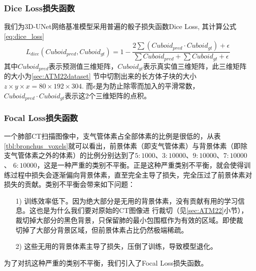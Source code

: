 \subsubsection{Dice Loss损失函数}
我们为3D-UNet网络基准模型采用普遍的骰子损失函数Dice Loss, 其计算公式\ref{eq:dice_loss}
\begin{equation}\label{eq:dice_loss}
    L_{dice}\left(Cuboid_{pred}, Cuboid_{gt}\right) = 1 - \frac{2\sum{\left(Cuboid_{pred} \cdot Cuboid_{gt}\right)} + \epsilon}
    {\sum{Cuboid_{pred}} + \sum{Cuboid_{gt}} + \epsilon}
\end{equation}
其中${Cuboid}_{pred}$表示预测值三维矩阵，${Cuboid}_{gt}$表示真实值三维矩阵，此三维矩阵的大小为\ref{sec:ATM22dataset}
节中切割出来的长方体子块的大小$z \times y \times x = 80 \times 192 \times 304$. 而$\epsilon$是为防止除零而加入的平滑常数，
$Cuboid_{pred} \cdot Cuboid_{gt}$表示这2个三维矩阵的点积。

\subsubsection{Focal Loss损失函数}

一个肺部CT扫描图像中，支气管体素占全部体素的比例是很低的，从表\ref{tbl:bronchus_voxels}就可以看出，前景体素（即支气管体素）与背景体素（即除支气管体素之外的体素）的比例分别达到了$5:1000$、$3:10000$、$9:10000$、$7:10000$、 $6:10000$，这是一种严重的类别不平衡。正是这种严重类别不平衡，就会使得训练过程中损失会逐渐偏向背景体素，直至完全主导了损失，完全压过了前景体素对损失的贡献。类别不平衡会带来如下问题：
\begin{enumerate}
	\item[1)]训练效率低下。因为绝大部分是无用的背景体素，没有贡献有用的学习信息。这也是为什么我们要对原始的CT图像进
					行裁切（见\ref{sec:ATM22}小节），裁切掉大部分的黑色背景，只保留肺的最小包围框作为有效的区域。即使裁
					切掉了大部分背景区域，但前景体素占比仍然极端稀疏。
	\item[2)]这些无用的背景体素主导了损失，压倒了训练，导致模型退化。
\end{enumerate}
为了对抗这种严重的类别不平衡，我们引入了Focal Loss损失函数\cite{Lin2017FocalLF}。

